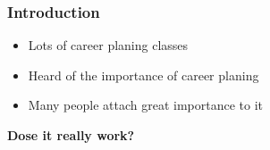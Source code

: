 \begin{frame}
    \frametitle{Introduction}
    \Large
    \begin{itemize}[<+->]
        \item Lots of career planing classes
        \item Heard of the importance of career planing
        \item Many people attach great importance to it
    \end{itemize}

    \begin{center}
        \LARGE
        \textbf{Dose it really work?} 
    \end{center}
\end{frame}